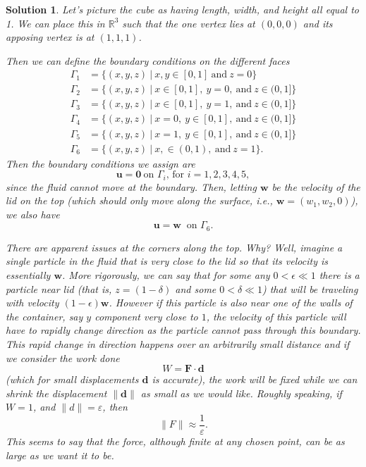 \documentclass[leqno]{article}
\theoremstyle{nonumberplain}
\newtheorem{solution}{Solution}
\newcommand{\R}{\mathbb{R}}
\begin{document}
\begin{solution}
Let's picture the cube as having length, width, and height all equal to 1.  We can place this in $\R^3$ such that the one vertex lies at $(0,0,0)$ and its apposing vertex is at $(1,1,1)$.  

\begin{center}
\end{center}

Then we can define the boundary conditions on the different faces
\begin{align*}
    \Gamma_1 &= \{ (x,y,z) ~\vert~ x,y \in [0,1] ~\textrm{and}~ z=0\}\\
    \Gamma_2 &= \{ (x,y,z) ~\vert~ x \in [0,1], ~y=0,  ~\textrm{and}~ z\in (0,1]\}\\
    \Gamma_3 &= \{ (x,y,z) ~\vert~ x \in [0,1], ~y=1,  ~\textrm{and}~ z\in (0,1]\}\\
    \Gamma_4 &= \{ (x,y,z) ~\vert~ x=0 , ~y\in [0,1],  ~\textrm{and}~ z\in (0,1]\}\\
    \Gamma_5 &= \{ (x,y,z) ~\vert~ x=1, ~y\in [0,1],  ~\textrm{and}~ z\in (0,1]\}\\
    \Gamma_6 &= \{ (x,y,z) ~\vert~ x, \in (0,1), ~\textrm{and}~ z=1\}.
\end{align*}
Then the boundary conditions we assign are
\[
\mathbf{u} = \mathbf{0} ~\textrm{on $\Gamma_i$, for $i=1,2,3,4,5$},
\]
since the fluid cannot move at the boundary.  Then, letting $\mathbf{w}$ be the velocity of the lid on the top (which should only move along the surface, i.e., $\mathbf{w}=(w_1,w_2,0)$), we also have
\[
\mathbf{u}= \mathbf{w} ~\textrm{ on $\Gamma_6$}.
\]

There are apparent issues at the corners along the top.  Why?  Well, imagine a single particle in the fluid that is very close to the lid so that its velocity is essentially $\mathbf{w}$.  More rigorously, we can say that for some any $0<\epsilon \ll 1$ there is a particle near lid (that is, $z=(1-\delta)$ and some $0<\delta\ll 1$) that will be traveling with velocity $(1-\epsilon)\mathbf{w}$. However if this particle is also near one of the walls of the container, say $y$ component very close to $1$, the velocity of this particle will have to rapidly change direction as the particle cannot pass through this boundary.  This rapid change in direction happens over an arbitrarily small distance and if we consider the work done
\[
W=\mathbf{F}\cdot \mathbf{d}
\]
(which for small displacements $\mathbf{d}$ is accurate), the work will be fixed while we can shrink the displacement $\|\mathbf{d}\|$ as small as we would like.  Roughly speaking, if $W=1$, and $\|d\|=\varepsilon$, then
\[
\|F\|\approx \frac{1}{\varepsilon}.
\]
This seems to say that the force, although finite at any chosen point, can be as large as we want it to be.


\end{solution}
\end{document}
